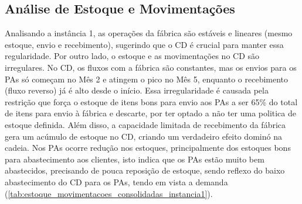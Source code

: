 \subsection[Análise de Estoque e Movimentações]{Análise de Estoque e Movimentações}
\label{Análise_de_Estoque_e_Movimentaçãoes}

Analisando a instância 1, as operações da fábrica são estáveis e lineares (mesmo estoque, envio e recebimento), sugerindo que o CD é crucial para manter essa regularidade. Por outro lado, o estoque e as movimentações no CD são irregulares. No CD, os fluxos com a fábrica são constantes, mas os envios para os PAs só começam no Mês 2 e atingem o pico no Mês 5, enquanto o recebimento (fluxo reverso) já é alto desde o início. Essa irregularidade é causada pela restrição que força o estoque de itens bons para envio aos PAs a ser 65\% do total de itens para envio à fábrica e descarte, por ter optado a não ter uma politica de estoque definida. Além disso, a capacidade limitada de recebimento da fábrica gera um acúmulo de estoque no CD, criando um verdadeiro efeito dominó na cadeia. Nos PAs ocorre redução nos estoques, principalmente dos estoques bons para abastecimento aos clientes, isto indica que os PAs estão muito bem abastecidos, precisando de pouca reposição de estoque, sendo reflexo do baixo abastecimento do CD para os PAs, tendo em vista a demanda (\autoref{tab:estoque_movimentacoes_consolidadas_instancia1}).


